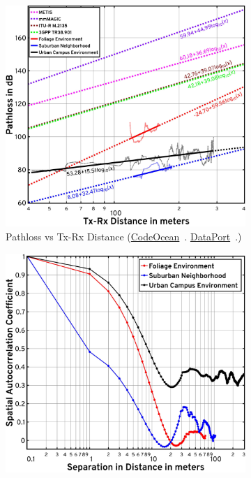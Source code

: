 \documentclass[10pt, twocolumn]{IEEEtran}
\begin{document}
{\begin{figure} [t]
\begin{subfigure}{0.49\linewidth}
        \includegraphics[width=0.95\linewidth]{figs/pathloss_vs_distance.pdf}
        \caption{Pathloss vs Tx-Rx Distance (\href{https://codeocean.com/capsule/9545863/tree}{CodeOcean}~\cite{CodeOcean}. \href{http://ieee-dataport.org/12580}{DataPort}~\cite{DataPort}.)}
        \label{F7a}
    \end{subfigure}
    \begin{subfigure}{0.5\linewidth}
        \centering
        \includegraphics[width=0.95\linewidth]{figs/spatial_consistency_vs_distance.pdf}

\end{subfigure}
\end{figure}}
\end{document}
